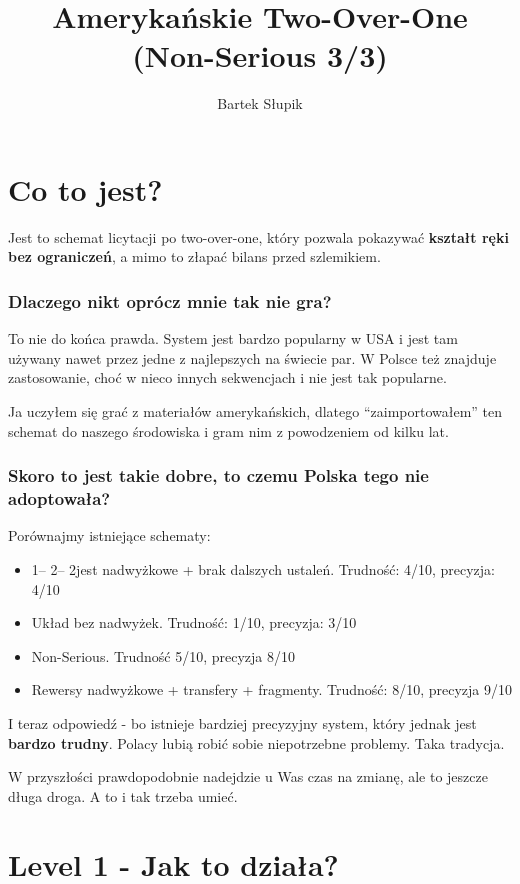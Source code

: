 \documentclass[12pt, a4paper]{article}
\title{Amerykańskie Two-Over-One (Non-Serious 3\spades/3\nt)}
\date{}
\author{Bartek Słupik }
\begin{document}
\maketitle

\section*{Co to jest?}
Jest to schemat licytacji po two-over-one, który pozwala pokazywać \textbf{kształt ręki bez ograniczeń}, a mimo to złapać bilans przed szlemikiem.


\subsubsection*{Dlaczego nikt oprócz mnie tak nie gra?}
To nie do końca prawda. System jest bardzo popularny w USA i jest tam używany nawet przez jedne z najlepszych na świecie par.
W Polsce też znajduje zastosowanie, choć w nieco innych sekwencjach i nie jest tak popularne.

Ja uczyłem się grać z materiałów amerykańskich, dlatego ``zaimportowałem'' ten schemat do naszego środowiska i gram nim z powodzeniem od kilku lat.


\subsubsection*{Skoro to jest takie dobre, to czemu Polska tego nie adoptowała?}
Porównajmy istniejące schematy:
\begin{itemize}
	\item 1\hearts -- 2\clubs -- 2\spades jest nadwyżkowe + brak dalszych ustaleń. Trudność: 4/10, precyzja: 4/10
	\item Układ bez nadwyżek. Trudność: 1/10, precyzja: 3/10 
	\item Non-Serious. Trudność 5/10, precyzja 8/10
	\item Rewersy nadwyżkowe + transfery + fragmenty. Trudność: 8/10, precyzja 9/10	
\end{itemize}

I teraz odpowiedź - bo istnieje bardziej precyzyjny system, który jednak jest \textbf{bardzo trudny}. Polacy lubią robić sobie niepotrzebne problemy. Taka tradycja.

W przyszłości prawdopodobnie nadejdzie u Was czas na zmianę, ale to jeszcze długa droga. A to i tak trzeba umieć.

\vspace{2cm}
\section*{Level 1 - Jak to działa?}
\end{document}

